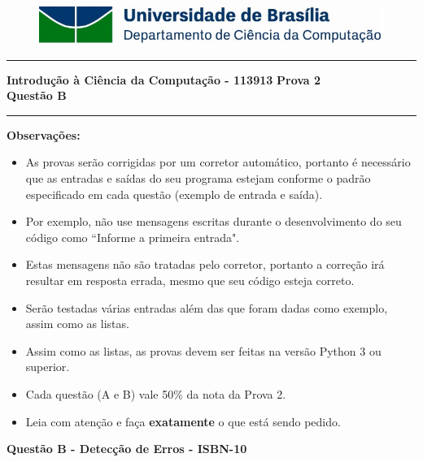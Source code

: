 \documentclass[a4paper, 12pt]{article}
\begin{document}
\begin{figure}[H]
	\includegraphics[scale=0.9]{UnB_CiC_Logo.jpg}
\end{figure}
\noindent\rule{\textwidth}{0.4pt}
\begin{center}
	\textbf{{\Large Introdução à Ciência da Computação - 113913}} \newline \newline
	\textbf{{\large Prova 2} \\
	\vspace{9pt}
	{\large Questão B}} \\
	\noindent\rule{\textwidth}{0.4pt}
	\newline
\end{center}

\textbf{{\large Observações:}}
\begin{itemize}
	\item As provas serão corrigidas por um corretor automático, portanto é necessário que as entradas e saídas do seu programa estejam conforme o padrão especificado em cada questão (exemplo de entrada e saída).
	\item Por exemplo, não use mensagens escritas durante o desenvolvimento do seu código como “Informe a primeira entrada".
	\item Estas mensagens não são tratadas pelo corretor, portanto a correção irá resultar em resposta errada, mesmo que seu código esteja correto.
	\item Serão testadas várias entradas além das que foram dadas como exemplo, assim como as listas.
	\item Assim como as listas, as provas devem ser feitas na versão Python 3 ou superior.
	\item Cada questão (A e B) vale 50\% da nota da Prova 2.
	\item Leia com atenção e faça \textbf{exatamente} o que está sendo pedido.


\end{itemize}
\newpage %
\begin{center}
\textbf{{\Large Questão B - Detecção de Erros - ISBN-10}}
\end{center}

\vspace{5pt} 
\end{document}
